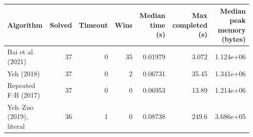\begin{tabular}{lrrrrrr}
\toprule
Algorithm & Solved & Timeout & Wins & Median time (s) & Max completed (s) & Median peak memory (bytes) \\
\midrule
Bai et al. (2021) & 37 & 0 & 35 & 0.01979 & 3.072 & 1.124e+06 \\
Yeh (2018) & 37 & 0 & 2 & 0.06731 & 35.45 & 1.341e+06 \\
Repeated F-B (2017) & 37 & 0 & 0 & 0.06953 & 13.89 & 1.214e+06 \\
Yeh--Zuo (2019), literal & 36 & 1 & 0 & 0.08738 & 249.6 & 3.686e+05 \\
\bottomrule
\end{tabular}
